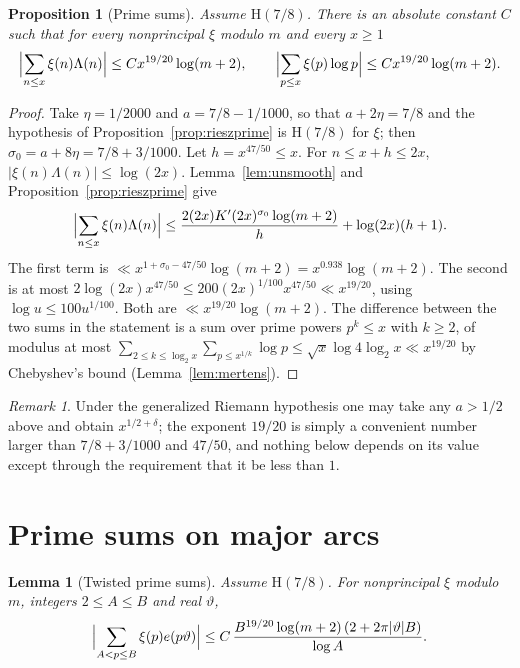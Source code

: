 \documentclass[11pt]{amsart}
\newtheorem{proposition}[theorem]{Proposition}
\newtheorem{lemma}[theorem]{Lemma}
\theoremstyle{definition}
\theoremstyle{remark}
\newtheorem{remark}[theorem]{Remark}
\numberwithin{equation}{section}
\newcommand{\e}{e}
\begin{document}
\begin{proposition}[Prime sums]\label{prop:primesum}
Assume $\mathrm H(7/8)$. There is an absolute constant $C$ such that for every
nonprincipal $\xi$ modulo $m$ and every $x\ge1$
\[
\Bigl|\sum_{n\le x}\xi(n)\Lambda(n)\Bigr|\le Cx^{19/20}\log(m+2),\qquad
\Bigl|\sum_{p\le x}\xi(p)\log p\Bigr|\le Cx^{19/20}\log(m+2).
\]
\end{proposition}

\begin{proof}
Take $\eta=1/2000$ and $a=7/8-1/1000$, so that $a+2\eta=7/8$ and the hypothesis
of Proposition~\ref{prop:rieszprime} is $\mathrm H(7/8)$ for $\xi$; then
$\sigma_0=a+8\eta=7/8+3/1000$. Let $h=x^{47/50}\le x$. For $n\le x+h\le2x$,
$|\xi(n)\Lambda(n)|\le\log(2x)$. Lemma~\ref{lem:unsmooth} and
Proposition~\ref{prop:rieszprime} give
\[
\Bigl|\sum_{n\le x}\xi(n)\Lambda(n)\Bigr|\le\frac{2(2x)K'(2x)^{\sigma_0}\log(m+2)}h+\log(2x)(h+1).
\]
The first term is $\ll x^{1+\sigma_0-47/50}\log(m+2)=x^{0.938}\log(m+2)$. The second is
at most $2\log(2x)x^{47/50}\le200(2x)^{1/100}x^{47/50}\ll x^{19/20}$, using
$\log u\le100u^{1/100}$. Both are $\ll x^{19/20}\log(m+2)$. The difference between
the two sums in the statement is a sum over prime powers $p^k\le x$ with $k\ge2$,
of modulus at most $\sum_{2\le k\le\log_2x}\sum_{p\le x^{1/k}}\log p\le\sqrt
x\log4\log_2x\ll x^{19/20}$ by Chebyshev's bound (Lemma~\ref{lem:mertens}).
\end{proof}

\begin{remark}
Under the generalized Riemann hypothesis one may take any $a>1/2$ above and
obtain $x^{1/2+\delta}$; the exponent $19/20$ is simply a convenient number
larger than $7/8+3/1000$ and $47/50$, and nothing below depends on its value
except through the requirement that it be less than $1$.
\end{remark}

\section{Prime sums on major arcs}\label{sec:major}

\begin{lemma}[Twisted prime sums]\label{lem:twist}
Assume $\mathrm H(7/8)$. For nonprincipal $\xi$ modulo $m$, integers $2\le A\le B$
and real $\vartheta$,
\[
\Bigl|\sum_{A<p\le B}\xi(p)\e(p\vartheta)\Bigr|\le C\,\frac{B^{19/20}\log(m+2)\,(2+2\pi|\vartheta|B)}{\log A}.
\]
\end{lemma}
\end{document}
